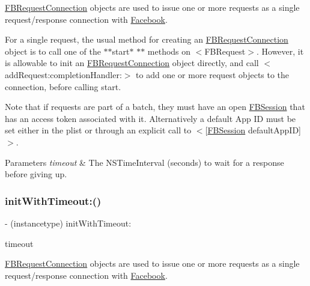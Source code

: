 {\ttfamily \hyperlink{interfaceFBRequestConnection}{F\+B\+Request\+Connection}} objects are used to issue one or more requests as a single request/response connection with \hyperlink{interfaceFacebook}{Facebook}.

For a single request, the usual method for creating an {\ttfamily \hyperlink{interfaceFBRequestConnection}{F\+B\+Request\+Connection}} object is to call one of the $\ast$$\ast$start$\ast$ $\ast$$\ast$ methods on $<$\+F\+B\+Request$>$. However, it is allowable to init an {\ttfamily \hyperlink{interfaceFBRequestConnection}{F\+B\+Request\+Connection}} object directly, and call $<$add\+Request\+:completion\+Handler\+:$>$ to add one or more request objects to the connection, before calling start.

Note that if requests are part of a batch, they must have an open \hyperlink{interfaceFBSession}{F\+B\+Session} that has an access token associated with it. Alternatively a default App ID must be set either in the plist or through an explicit call to $<$\mbox{[}\hyperlink{interfaceFBSession}{F\+B\+Session} default\+App\+ID\mbox{]}$>$.


\begin{DoxyParams}{Parameters}
{\em timeout} & The {\ttfamily N\+S\+Time\+Interval} (seconds) to wait for a response before giving up. \\
\hline
\end{DoxyParams}
\mbox{\label{interfaceFBRequestConnection_a00435ea153b22e8613108afdbabcadff}} 
\subsubsection{\texorpdfstring{init\+With\+Timeout\+:()}{initWithTimeout:()}\hspace{0.1cm}{\footnotesize\ttfamily [3/5]}}
{\footnotesize\ttfamily -\/ (instancetype) init\+With\+Timeout\+: \begin{DoxyParamCaption}\item[{(N\+S\+Time\+Interval)}]{timeout }\end{DoxyParamCaption}}

{\ttfamily \hyperlink{interfaceFBRequestConnection}{F\+B\+Request\+Connection}} objects are used to issue one or more requests as a single request/response connection with \hyperlink{interfaceFacebook}{Facebook}.

